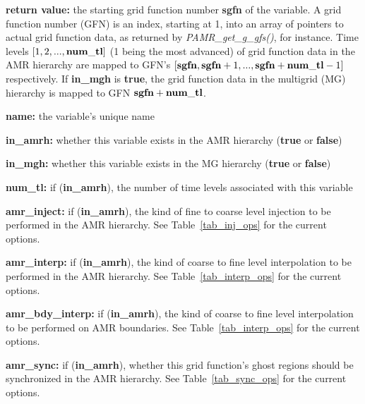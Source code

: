 \documentclass[aps,amssymb,unsortedaddress,nofootinbib]{revtex4}
\def\lsep{\itemsep 0.05in}
\begin{document}
\begin{list}{}{\lsep}
\item {\bf return value:} the starting grid function number {\bf sgfn} of the variable. 
          A grid function number (GFN) is
          an index, starting at 1, into an array of pointers to actual grid function
          data, as returned by {\em PAMR\_get\_g\_gfs()}, for instance. 
          Time levels $[1,2,...,\bf{num\_tl}]$ (1 being the most advanced) of grid function
          data in the AMR hierarchy are mapped to {GFN}'s 
          $[{\bf sgfn},{\bf sgfn}+1,...,{\bf sgfn}+{\bf num\_tl}-1]$
          respectively. If {\bf in\_mgh} is {\bf true}, the grid function data in the
          multigrid (MG) hierarchy is mapped to GFN ${\bf sgfn}+{\bf num\_tl}$.

\item {\bf name:} the variable's unique name 

\item {\bf in\_amrh:} whether this variable exists in the AMR hierarchy ({\bf true} or {\bf false}) 

\item {\bf in\_mgh:} whether this variable exists in the MG hierarchy ({\bf true} or {\bf false}) 

\item {\bf num\_tl:} if ({\bf in\_amrh}), the number of time levels associated with this variable 

\item {\bf amr\_inject:} if ({\bf in\_amrh}), the kind of fine to coarse level injection to be performed
          in the AMR hierarchy.
          See Table~\ref{tab_inj_ops} for the current options. 

\item {\bf amr\_interp:} if ({\bf in\_amrh}), the kind of coarse to fine level interpolation to be performed
          in the AMR hierarchy.
          See Table~\ref{tab_interp_ops} for the current options. 

\item {\bf amr\_bdy\_interp:} if ({\bf in\_amrh}), the kind of coarse to fine level interpolation to be performed
          on AMR boundaries. See Table~\ref{tab_interp_ops} for the current options. 

\item {\bf amr\_sync:} if ({\bf in\_amrh}), whether this grid function's ghost regions should be 
          synchronized in the AMR hierarchy.
          See Table~\ref{tab_sync_ops} for the current options. 


\end{list}
\end{document}
